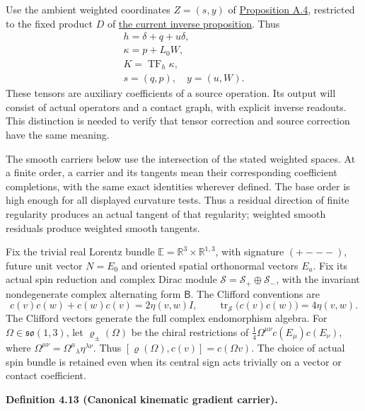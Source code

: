\documentclass[
  english,
  11pt,
  reqno]{amsart}
\makeatletter
\newcommand{\pandocstatementheading}[1]{%
  \par\if@nobreak\else
    \addpenalty{\@beginparpenalty}%
    \addvspace{.5\baselineskip plus .2\baselineskip minus .2\baselineskip}%
  \fi
  {\normalfont\bfseries #1\par}%
  \nobreak\@afterindenttrue\@afterheading
}
\makeatother
\begin{document}
Use the ambient weighted coordinates \(Z=(s,y)\) of
\hyperref[prop:online-chart-exact-ambient-decoder]{Proposition A.4},
restricted to the fixed product \(D\) of
\hyperref[prop:online-current-inverse-horizontal-flatness]{the current
inverse proposition}. Thus \[
\begin{gathered}
h=\delta+q+u\delta, \\
\kappa=p+L_0W, \\
K=\operatorname{TF}_h\kappa, \\
s=(q,p),\quad y=(u,W).
\end{gathered}
\] These tensors are auxiliary coefficients of a source operation. Its
output will consist of actual operators and a contact graph, with
explicit inverse readouts. This distinction is needed to verify that
tensor correction and source correction have the same meaning.

The smooth carriers below use the intersection of the stated weighted
spaces. At a finite order, a carrier and its tangents mean their
corresponding coefficient completions, with the same exact identities
wherever defined. The base order is high enough for all displayed
curvature tests. Thus a residual direction of finite regularity produces
an actual tangent of that regularity; weighted smooth residuals produce
weighted smooth tangents.

Fix the trivial real Lorentz bundle
\(\mathbb E=\mathbb R^3\times\mathbb R^{1,3}\), with signature
\((+---)\), future unit vector \(N=E_0\) and oriented spatial
orthonormal vectors \(E_a\). Fix its actual spin reduction and complex
Dirac module \(\mathscr S=\mathscr S_+\oplus\mathscr S_-\), with the
invariant nondegenerate complex alternating form \(\mathsf B\). The
Clifford conventions are%
 \[
c(v)c(w)+c(w)c(v)=2\eta(v,w)I,
\qquad
\operatorname{tr}_{\mathscr S}\bigl(c(v)c(w)\bigr)=4\eta(v,w).
\] The Clifford vectors generate the full complex endomorphism algebra.
For \(\Omega\in\mathfrak{so}(1,3)\), let \(\varrho_\pm(\Omega)\) be the
chiral restrictions of \(\frac14\Omega^{\mu\nu}c(E_\mu)c(E_\nu)\), where
\(\Omega^{\mu\nu}=\Omega^\mu{}_{\lambda}\eta^{\lambda\nu}\). Thus
\([\varrho(\Omega),c(v)]=c(\Omega v)\). The choice of actual spin bundle
is retained even when its central sign acts trivially on a vector or
contact coefficient.

\pandocstatementheading{\leavevmode{}\label{def:online-kinematic-gradient-carrier}Definition 4.13 (Canonical kinematic gradient carrier).}
\end{document}
